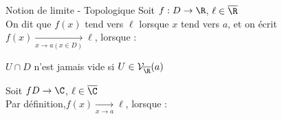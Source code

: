 \documentclass[12pt,a4paper]{report}
\begin{document}
\begin{definition}{Notion de limite - Topologique}{}
Soit $f:D \rightarrow \R$, $\ell\in \overline{\R}$\\
On dit que $f(x)$ tend vers $\ell$ lorsque $x$ tend vers $a$, et on écrit $f(x) \xrightarrow[x\rightarrow a (x\in D)]{} \ell$, lorsque : 
\begin{center}
\end{center}

\begin{remarque}
$U\cap D$ n'est jamais vide si $U \in \mathcal{V}_{\overline{\R}} (a)$
\end{remarque}

Soit $fD \rightarrow \C$, $\ell\in \overline{\C}$\\
Par définition,$f(x) \xrightarrow[x\rightarrow a]{} \ell$, lorsque : 
\begin{center}
\end{center}
\end{definition}

\pagebreak
\end{document}
